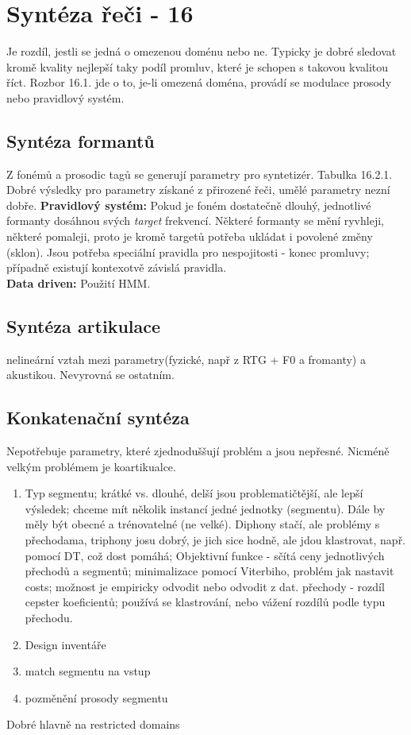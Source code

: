 \documentclass{article}
\begin{document}
\section*{Syntéza řeči - \cite{huang2001spoken}16}
Je rozdíl, jestli se jedná o omezenou doménu nebo ne. Typicky je dobré sledovat kromě kvality nejlepší taky podíl promluv, které je schopen s takovou kvalitou říct. Rozbor 16.1. jde o to, je-li omezená doména, provádí se modulace prosody nebo pravidlový systém.
\subsection*{Syntéza formantů}
Z fonémů a prosodic tagů  se generují parametry pro syntetizér. Tabulka 16.2.1. Dobré výsledky pro parametry získané z přirozené řeči, umělé parametry nezní  dobře.
\textbf{Pravidlový systém:} Pokud je foném dostatečně dlouhý, jednotlivé formanty dosáhnou svých \textit{target} frekvencí. Některé formanty se mění ryvhleji, některé pomaleji, proto je kromě targetů potřeba ukládat i povolené změny (sklon). Jsou potřeba speciální pravidla pro nespojitosti - konec promluvy; případně existují kontexotvě závislá pravidla.\\
\textbf{Data driven:} Použití HMM\cite{acero99HMM}.
\subsection*{Syntéza artikulace} nelineární vztah mezi parametry(fyzické, např z RTG + F0 a fromanty) a akustikou. Nevyrovná se ostatním.
\subsection*{Konkatenační syntéza}
Nepotřebuje parametry, které zjednoduššují problém a jsou nepřesné. Nicméně velkým problémem je koartikualce.
\begin{enumerate}
\item Typ segmentu; krátké vs. dlouhé, delší jsou problematičtější, ale lepší výsledek; chceme mít několik instancí jedné jednotky (segmentu). Dále by měly být obecné a trénovatelné (ne velké). Diphony stačí, ale problémy s přechodama, triphony josu dobrý, je jich sice hodně, ale jdou klastrovat, např. pomocí DT, což dost pomáhá; Objektivní funkce - sčítá ceny jednotlivých přechodů a segmentů; minimalizace pomocí Viterbiho, problém jak nastavit costs; možnost je empiricky odvodit nebo odvodit z dat. přechody - rozdíl cepster koeficientů; používá se klastrování, nebo vážení rozdílů podle typu přechodu. 
\item Design inventáře
\item match segmentu na vstup
\item pozměnění prosody segmentu
\end{enumerate}
Dobré hlavně na restricted domains
\end{document}
